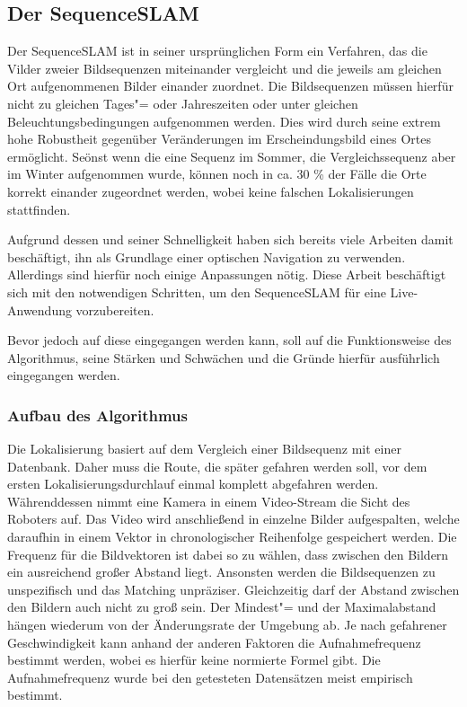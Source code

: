 \documentclass[12pt,a4paper,titlepage]{scrartcl}
\begin{document}
\subsection{Der SequenceSLAM}
Der SequenceSLAM ist in seiner ursprünglichen Form ein Verfahren, das die Vilder zweier Bildsequenzen miteinander vergleicht und die jeweils am gleichen Ort aufgenommenen Bilder einander zuordnet. Die Bildsequenzen müssen hierfür nicht zu gleichen Tages"= oder Jahreszeiten oder unter gleichen Beleuchtungsbedingungen aufgenommen werden. Dies wird durch seine extrem hohe Robustheit gegenüber Veränderungen im Erscheindungsbild eines Ortes ermöglicht. Seönst wenn die eine Sequenz im Sommer, die Vergleichssequenz aber im Winter aufgenommen wurde, können noch in ca. 30 \% der Fälle die Orte korrekt einander zugeordnet werden, wobei keine falschen Lokalisierungen stattfinden.

Aufgrund dessen und seiner Schnelligkeit haben sich bereits viele Arbeiten damit beschäftigt, ihn als Grundlage einer optischen Navigation zu verwenden. Allerdings sind hierfür noch einige Anpassungen nötig. Diese Arbeit beschäftigt sich mit den notwendigen Schritten, um den SequenceSLAM für eine Live-Anwendung vorzubereiten. 

Bevor jedoch auf diese eingegangen werden kann, soll auf die Funktionsweise des Algorithmus, seine Stärken und Schwächen und die Gründe hierfür ausführlich eingegangen werden. 
\subsubsection{Aufbau des Algorithmus}
Die Lokalisierung basiert auf dem Vergleich einer Bildsequenz mit einer Datenbank. Daher muss die Route, die später gefahren werden soll, vor dem ersten Lokalisierungsdurchlauf einmal komplett abgefahren werden. Währenddessen nimmt eine Kamera in einem Video-Stream die Sicht des Roboters auf. Das Video wird anschließend in einzelne Bilder aufgespalten, welche daraufhin in einem Vektor in chronologischer Reihenfolge gespeichert werden. Die Frequenz für die Bildvektoren ist dabei so zu wählen, dass zwischen den Bildern ein ausreichend großer Abstand liegt. Ansonsten werden die Bildsequenzen zu unspezifisch und das Matching unpräziser. Gleichzeitig darf der Abstand zwischen den Bildern auch nicht zu groß sein. Der Mindest"= und der Maximalabstand hängen wiederum von der Änderungsrate der Umgebung ab. Je nach gefahrener Geschwindigkeit kann anhand der anderen Faktoren die Aufnahmefrequenz bestimmt werden, wobei es hierfür keine normierte Formel gibt. Die Aufnahmefrequenz wurde bei den getesteten Datensätzen meist empirisch bestimmt. 
\end{document}

